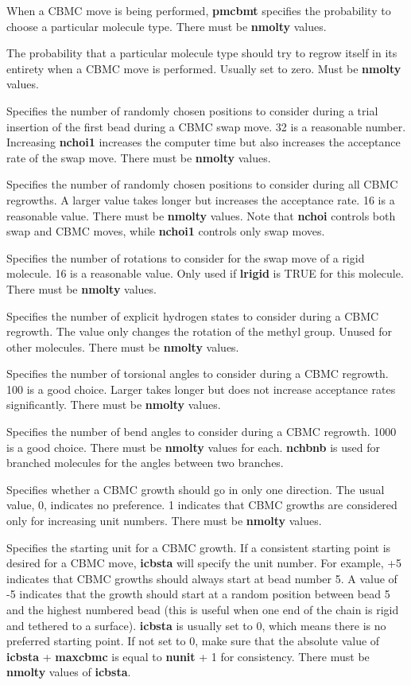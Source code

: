 \documentclass[12pt,letterpaper]{article}
\begin{document}
 When a CBMC move is being performed,
{\bf pmcbmt} specifies the probability to choose a particular
molecule type. There must be {\bf nmolty} values.

 The probability that a particular
molecule type should try to regrow itself in its entirety
when a CBMC move is performed. Usually set to zero. Must be
{\bf nmolty} values.

 Specifies the number of randomly
chosen positions to consider during a trial insertion of the
first bead during a CBMC swap move. 32 is a reasonable
number. Increasing {\bf nchoi1} increases the computer time
but also increases the acceptance rate of the swap move.
There must be {\bf nmolty} values.

 Specifies the number of randomly
chosen positions to consider during all CBMC regrowths. A
larger value takes longer but increases the acceptance rate.
16 is a reasonable value. There must be {\bf nmolty} values.
Note that {\bf nchoi} controls both swap and CBMC moves,
while {\bf nchoi1} controls only swap moves.

 Specifies the number of rotations to
consider for the swap move of a rigid molecule. 16 is a
reasonable value. Only used if {\bf lrigid} is TRUE for this
molecule. There must be {\bf nmolty} values.

 Specifies the number of explicit
hydrogen states to consider during a CBMC regrowth. The
value only changes the rotation of the methyl group. Unused
for other molecules. There must be {\bf nmolty} values.

 Specifies the number of torsional
angles to consider during a CBMC regrowth. 100 is a good
choice. Larger takes longer but does not increase acceptance
rates significantly. There must be {\bf nmolty} values.

 Specifies the number of bend
angles to consider during a CBMC regrowth. 1000 is a good
choice. There must be \textbf{nmolty} values for each. {\bf
  nchbnb} is used for branched molecules for the angles
between two branches.

 Specifies whether a CBMC growth
should go in only one direction. The usual value, 0,
indicates no preference. 1 indicates that CBMC growths are
considered only for increasing unit numbers. There must be
{\bf nmolty} values.

 Specifies the starting unit for a
CBMC growth. If a consistent starting point is desired for a
CBMC move, {\bf icbsta} will specify the unit number. For
example, +5 indicates that CBMC growths should always start
at bead number 5. A value of -5 indicates that the growth
should start at a random position between bead 5 and the
highest numbered bead (this is useful when one end of the
chain is rigid and tethered to a surface). {\bf icbsta} is
usually set to 0, which means there is no preferred starting
point. If not set to 0, make sure that the absolute value of
{\bf icbsta} + {\bf maxcbmc} is equal to {\bf nunit} + 1 for
consistency. There must be {\bf nmolty} values of {\bf
  icbsta}.
\end{document}
